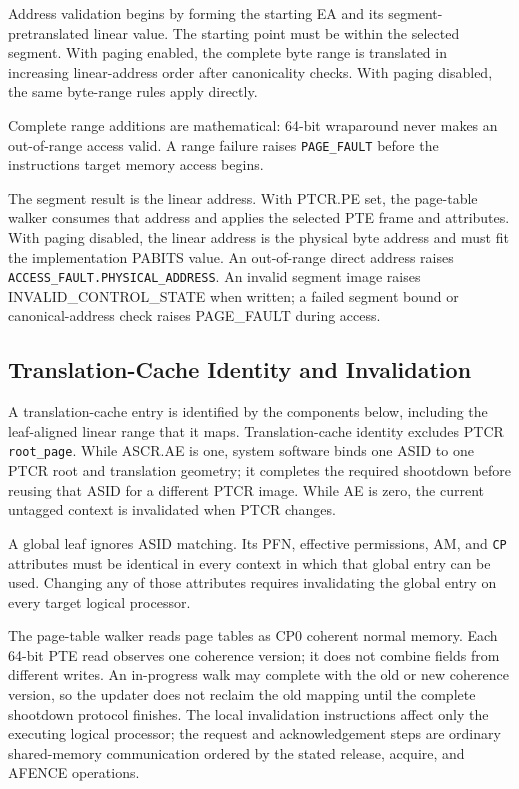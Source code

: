 Address validation begins by forming the starting EA and its segment-pretranslated linear value. The starting point
must be within the selected segment. With paging enabled, the complete byte range is translated in increasing
linear-address order after canonicality checks. With paging disabled, the same byte-range rules apply directly.

Complete range additions are mathematical: 64-bit wraparound never makes an out-of-range access valid. A range
failure raises \texttt{PAGE\_FAULT} before the instruction\textquotesingle{}s target memory access begins.

The segment result is the linear address. With PTCR.PE set, the page-table walker consumes that address and applies
the selected PTE frame and attributes. With paging disabled, the linear address is the physical byte address and
must fit the implementation PABITS value. An out-of-range direct address raises
\texttt{ACCESS\_FAULT.PHYSICAL\_ADDRESS}. An invalid segment image raises INVALID\_CONTROL\_STATE when written; a failed segment bound or
canonical-address check raises PAGE\_FAULT during access.





\subsection{Translation-Cache Identity and Invalidation}
A translation-cache entry is identified by the components below, including the leaf-aligned linear range that it
maps. Translation-cache identity excludes PTCR \texttt{root\_page}.
While ASCR.AE is one, system software binds one ASID to one PTCR root and translation geometry; it completes the
required shootdown before reusing that ASID for a different PTCR image. While AE is zero, the current untagged
context is invalidated when PTCR changes.



A global leaf ignores ASID matching. Its PFN, effective permissions, AM, and \texttt{CP} attributes must
be identical in every context in which that global entry can be used. Changing any of those attributes requires
invalidating the global entry on every target logical processor.

The page-table walker reads page tables as CP0 coherent normal memory. Each 64-bit PTE read observes one coherence
version; it does not combine fields from different writes. An in-progress walk may complete with the old or new
coherence version, so the updater does not reclaim the old mapping until the complete shootdown protocol finishes.
The local invalidation instructions affect only the executing logical processor; the request and acknowledgement
steps are ordinary shared-memory communication ordered by the stated release, acquire, and AFENCE operations.

